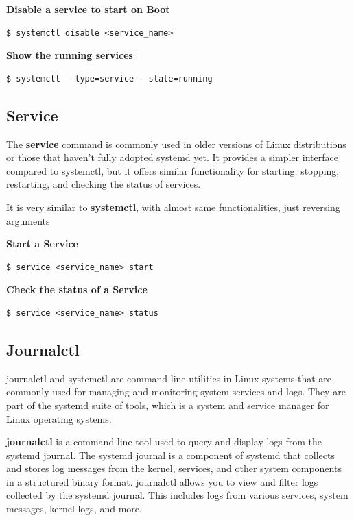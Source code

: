 \documentclass{article}
\newenvironment{codetemplate}[1][]{%
  \mybasecolorbox[#1]
  \itshape
}{%
  \endmybasecolorbox
}
\begin{document}
\textbf{Disable a service to start on Boot}
\begin{codetemplate}{}
\begin{verbatim}
$ systemctl disable <service_name>
\end{verbatim}
\end{codetemplate}

\textbf{Show the running services}
\begin{codetemplate}{}
\begin{verbatim}
$ systemctl --type=service --state=running
\end{verbatim}
\end{codetemplate}

\subsection{Service}

The \textbf{service} command is commonly used in older versions of Linux distributions or those that haven't fully adopted systemd yet. It provides a simpler interface compared to systemctl, but it offers similar functionality for starting, stopping, restarting, and checking the status of services.

It is very similar to \textbf{systemctl}, with almost same functionalities, just reversing arguments

\textbf{Start a Service}
\begin{codetemplate}{}
\begin{verbatim}
$ service <service_name> start
\end{verbatim}
\end{codetemplate}

\textbf{Check the status of a Service}
\begin{codetemplate}{}
\begin{verbatim}
$ service <service_name> status
\end{verbatim}
\end{codetemplate}

\subsection{Journalctl}
journalctl and systemctl are command-line utilities in Linux systems that are commonly used for managing and monitoring system services and logs. They are part of the systemd suite of tools, which is a system and service manager for Linux operating systems.

\textbf{journalctl} is a command-line tool used to query and display logs from the systemd journal. The systemd journal is a component of systemd that collects and stores log messages from the kernel, services, and other system components in a structured binary format.
journalctl allows you to view and filter logs collected by the systemd journal. This includes logs from various services, system messages, kernel logs, and more.
\end{document}
